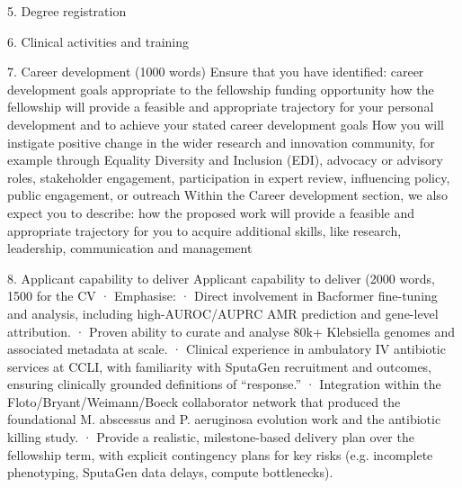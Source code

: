 5. Degree registration


6. Clinical activities and training


7. Career development  (1000 words)
Ensure that you have identified: career development goals appropriate to the fellowship funding opportunity how the fellowship will provide a feasible and appropriate trajectory for your personal development and to achieve your stated career development goals 
How you will instigate positive change in the wider research and innovation community, for example through Equality Diversity and Inclusion (EDI), advocacy or advisory roles, stakeholder engagement, participation in expert review, influencing policy, public engagement, or outreach 
Within the Career development section, we also expect you to describe: how the proposed work will provide a feasible and appropriate trajectory for you to acquire additional skills, like research, leadership, communication and management


8. Applicant capability to deliver Applicant capability to deliver (2000 words, 1500 for the CV
·   	Emphasise:
·   	Direct involvement in Bacformer fine-tuning and analysis, including high-AUROC/AUPRC AMR prediction and gene-level attribution.​
·   	Proven ability to curate and analyse 80k+ Klebsiella genomes and associated metadata at scale.
·   	Clinical experience in ambulatory IV antibiotic services at CCLI, with familiarity with SputaGen recruitment and outcomes, ensuring clinically grounded definitions of “response.”​
·   	Integration within the Floto/Bryant/Weimann/Boeck collaborator network that produced the foundational M. abscessus and P. aeruginosa evolution work and the antibiotic killing study.
·   	Provide a realistic, milestone-based delivery plan over the fellowship term, with explicit contingency plans for key risks (e.g. incomplete phenotyping, SputaGen data delays, compute bottlenecks).

